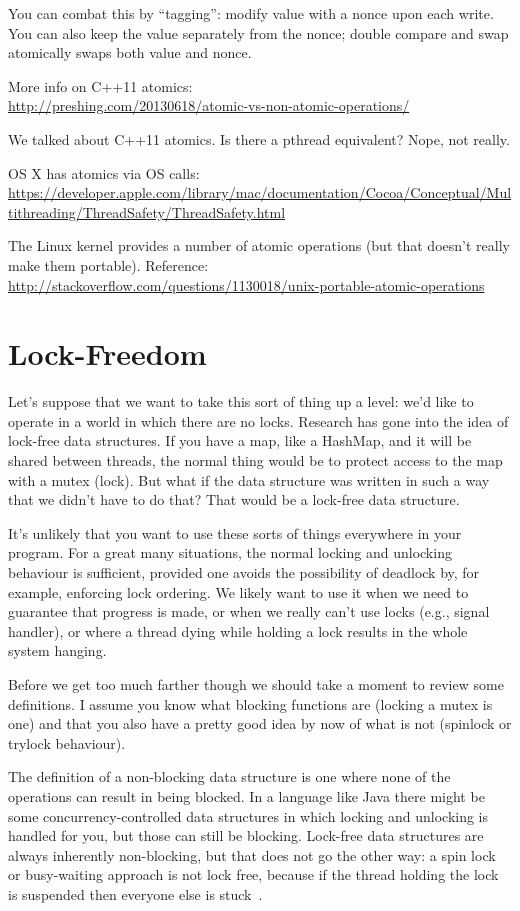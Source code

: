 \documentclass[a4paper]{report}
\begin{document}
You can combat this by ``tagging'': modify value with a nonce upon each
write.  You can also keep the value separately from the nonce; double
compare and swap atomically swaps both value and nonce.


More info on C++11 atomics:\\
\url{http://preshing.com/20130618/atomic-vs-non-atomic-operations/}

We talked about C++11 atomics. Is there a pthread equivalent? Nope, not really.

OS X has atomics via OS calls: \\
\url{https://developer.apple.com/library/mac/documentation/Cocoa/Conceptual/Multithreading/ThreadSafety/ThreadSafety.html}

The Linux kernel provides a number of atomic operations (but that doesn't really make them portable). Reference:
\url{http://stackoverflow.com/questions/1130018/unix-portable-atomic-operations}

\section*{Lock-Freedom}

Let's suppose that we want to take this sort of thing up a level: we'd like to operate in a world in which there are no locks. Research has gone into the idea of lock-free data structures. If you have a map, like a HashMap, and it will be shared between threads, the normal thing would be to protect access to the map with a mutex (lock). But what if the data structure was written in such a way that we didn't have to do that? That would be a lock-free data structure.

It's unlikely that you want to use these sorts of things everywhere in your program. For a great many situations, the normal locking and unlocking behaviour is sufficient, provided one avoids the possibility of deadlock by, for example, enforcing lock ordering. We likely want to use it when we need to guarantee that progress is made, or when we really can't use locks (e.g., signal handler), or where a thread dying while holding a lock results in the whole system hanging.

Before we get too much farther though we should take a moment to review some definitions. I assume you know what blocking functions are (locking a mutex is one) and that you also have a pretty good idea by now of what is not (spinlock or trylock behaviour). 

The definition of a non-blocking data structure is one where none of the operations can result in being blocked. In a language like Java there might be some concurrency-controlled data structures in which locking and unlocking is handled for you, but those can still be blocking. Lock-free data structures are always inherently non-blocking, but that does not go the other way: a spin lock or busy-waiting approach is not lock free, because if the thread holding the lock is suspended then everyone else is stuck~\cite{nblfwf}.
\end{document}
